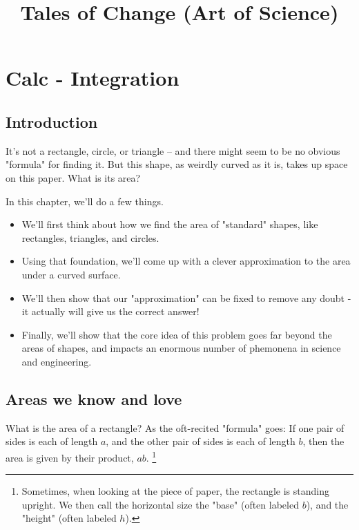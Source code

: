 \documentclass{book}
\title{Tales of Change (Art of Science)}
\date{\vspace{-5ex}}
\begin{document}
\maketitle



\chapter{Calc - Integration}

\section{Introduction}

It's not a rectangle, circle, or triangle -- and there might seem to be no obvious "formula" for finding it. But this shape, as weirdly curved as it is, takes up space on this paper. What is its area? 


In this chapter, we'll do a few things. 

\begin{itemize}
\item We'll first think about how we find the area of "standard" shapes, like rectangles, triangles, and circles.
\item Using that foundation, we'll come up with a clever approximation to the area under a curved surface. 
\item We'll then show that our "approximation" can be fixed to remove any doubt - it actually will give us the correct answer!
\item Finally, we'll show that the core idea of this problem goes far beyond the areas of shapes, and impacts an enormous number of phemonena in science and engineering.
\end{itemize}


\section{Areas we know and love}

What is the area of a rectangle? As the oft-recited "formula" goes: If one pair of sides is each of length $a$, and the other pair of sides is each of length $b$, then the area is given by their product, $ab$. \footnote{Sometimes, when looking at the piece of paper, the rectangle is standing upright. We then call the horizontal size the "base" (often labeled $b$), and the "height" (often labeled $h$).}
\end{document}

